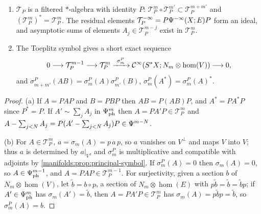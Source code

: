 \begin{proposition}\label{manifolds:prop:toeplitz-calculus}
\begin{enumerate}[label=\textup{(\alph*)}]
\item $\mathcal T_P$ is a filtered $*$-algebra with identity $P$:
$\mathcal T^m_P\circ\mathcal T^{m'}_P\subset\mathcal T^{m+m'}_P$ and $(\mathcal T^m_P)^*=\mathcal T^m_P$. The
residual elements $\mathcal T^{-\infty}_P=P\Psi^{-\infty}(X;E)P$ form an ideal, and
asymptotic sums of elements $A_j\in\mathcal T^{m-j}_P$ exist in $\mathcal T^m_P$.
\item The Toeplitz symbol gives a short exact sequence
\begin{equation*}
0\longrightarrow\mathcal T^{m-1}_P\longrightarrow\mathcal T^m_P\xrightarrow{\ \sigma^P_m\ }
\mathcal{C}^\infty(S^*X;N_m\otimes\hom(V))\longrightarrow0,
\end{equation*}
and $\sigma^P_{m+m'}(AB)=\sigma^P_m(A)\sigma^P_{m'}(B)$, $\sigma^P_m(A^*)=\sigma^P_m(A)^*$.
\end{enumerate}
\end{proposition}
\begin{proof}
(a) If $A=PAP$ and $B=PBP$ then $AB=P(AB)P$, and $A^*=PA^*P$ since $P^*=P$. If
$A'\sim\sum_jA_j$ in $\Psi^{m}_{\mathrm{ph}}$ then $A=PA'P\in\mathcal T^m_P$ and
$A-\sum_{j<N}A_j=P(A'-\sum_{j<N}A_j)P\in\Psi^{m-N}$.

(b) For $A\in\mathcal T^m_P$, $a=\sigma_m(A)=p\,a\,p$, so $a$ vanishes on $V^\perp$ and maps $V$
into $V$; thus $a$ is determined by $a|_V$, and $\sigma^P_m$ is multiplicative and
compatible with adjoints by \cref{manifolds:prop:principal-symbol}. If
$\sigma^P_m(A)=0$ then $\sigma_m(A)=0$, so $A\in\Psi^{m-1}_{\mathrm{ph}}$, and $A=PAP\in\mathcal T^{m-1}_P$.
For surjectivity, given a section $b$ of $N_m\otimes\hom(V)$, let $\tilde b=b\circ p$, a
section of $N_m\otimes\hom(E)$ with $p\tilde b=\tilde b=\tilde bp$; if $A'\in\Psi^{m}_{\mathrm{ph}}$
has $\sigma_m(A')=\tilde b$, then $A=PA'P\in\mathcal T^m_P$ has $\sigma_m(A)=p\tilde bp=\tilde b$, so
$\sigma^P_m(A)=b$.
\end{proof}

